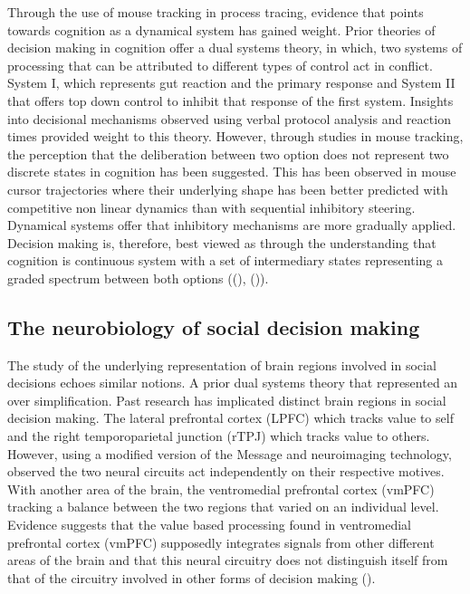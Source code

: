 \documentclass[man, floatsintext]{apa7}
\begin{document}
Through the use of mouse tracking in process tracing, evidence that points towards cognition as a dynamical system has gained weight. Prior theories of decision making in cognition offer a dual systems theory, in which, two systems of processing that can be attributed to different types of control act in conflict. System I, which represents gut reaction and the primary response and System II that offers top down control to inhibit that response of the first system.  Insights into decisional mechanisms observed using verbal protocol analysis and reaction times provided weight to this theory. However, through studies in mouse tracking, the perception that the deliberation between two option does not represent two discrete states in cognition has been suggested. This has been observed in mouse cursor trajectories where their underlying shape has been better predicted with competitive non linear dynamics than with sequential inhibitory steering. Dynamical systems offer that inhibitory mechanisms are more gradually applied. Decision making is, therefore, best viewed as through the understanding that cognition is continuous system with a set of intermediary states representing a graded spectrum between both options ((\cite{spiveyContinuousDynamicsRealTime2006}), (\cite{stillmanHowMousetrackingCan2018})).

\subsection{The neurobiology of social decision making}

The study of the underlying representation of brain regions involved in social decisions echoes similar notions. A prior dual systems theory that represented an over simplification. Past research has implicated distinct brain regions in social decision making.  The lateral prefrontal cortex (LPFC) which tracks value to self and the right temporoparietal junction (rTPJ) which tracks value to others. However, using a modified version of the Message and neuroimaging technology, \citeauthor{shusterContributionSelfOtherregarding2020} observed the two neural circuits act independently on their respective motives. With another area of the brain, the ventromedial prefrontal cortex (vmPFC) tracking a balance between the two regions that varied on an individual level. Evidence suggests that the value based processing found in ventromedial prefrontal cortex (vmPFC) supposedly integrates signals from other different areas of the brain and that this neural circuitry does not distinguish itself from that of the circuitry involved in other forms of decision making (\cite{shusterContributionSelfOtherregarding2020}). 
\end{document}
